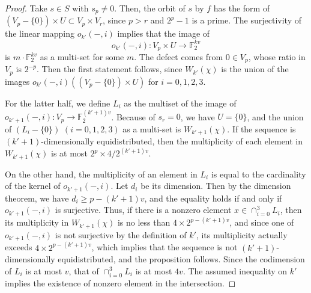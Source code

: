 \documentclass{svmult}
\def\F2{{\mathbb F}_2}
\begin{document}
\begin{proof}
Take $s \in S$ with $s_p \neq 0$. Then, the 
orbit of $s$ by $f$ has the form of
$(V_p - \{0\}) \times U \subset V_p \times V_r$,
since $p>r$ and $2^p-1$ is a prime.
The surjectivity of the linear mapping $o_{k'}(-,i)$
implies that the image of 
$$
o_{k'}(-,i): V_p \times U \to \F2^{kv}
$$
is $m\cdot \F2^{kv}$ as a multi-set for some $m$.
The defect comes from $0 \in V_p$, whose ratio
in $V_p$ is $2^{-p}$. Then the first statement follows,
since $W_{k'}(\chi)$ is the union of the images
$o_{k'}(-,i)((V_p-\{0\})\times U)$ for $i=0,1,2,3$.

For the latter half, we define
$L_i$ as the multiset of the image of 
$o_{k'+1}(-,i): V_p \to \F2^{(k'+1)v}$.
Because of $s_r=0$, we have $U=\{0\}$, and
the union of $(L_i-\{0\})$ $(i=0,1,2,3)$ as a multi-set is 
$W_{k'+1}(\chi)$. If the sequence is $(k'+1)$-dimensionally
equidistributed, then the multiplicity of
each element in $W_{k'+1}(\chi)$ is at most
$2^p\times 4/ 2^{(k'+1)v}$.

On the other hand, the multiplicity of 
an element in $L_i$ is equal to 
the cardinality of the kernel of $o_{k'+1}(-,i)$.
Let $d_i$ be its dimension. Then by the dimension theorem,
we have $d_i \geq p-(k'+1)v$, and the equality
holds if and only if $o_{k'+1}(-,i)$ is 
surjective.
Thus, if there is a nonzero element 
$x \in \cap_{i=0}^3{L_i}$, then its multiplicity
in $W_{k'+1}(\chi)$ is no less than 
$4 \times 2^{p-(k'+1)v}$, and since
one of $o_{k'+1}(-,i)$ is not surjective
by the definition of $k'$, its multiplicity
actually exceeds $4 \times 2^{p-(k'+1)v}$,
which implies that the sequence is not
$(k'+1)$-dimensionally equidistributed, and
the proposition follows. Since the codimension 
of $L_i$ is at most $v$, 
that of $\cap_{i=0}^3{L_i}$ is at most $4v$.
The assumed inequality on $k'$ implies the existence
of nonzero element in the intersection.
%
%
%
\end{proof}
\end{document}

